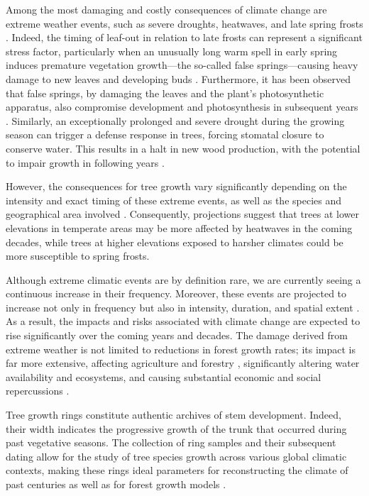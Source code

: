 \documentclass[12pt, a4paper]{article}
\begin{document}
Among the most damaging and costly consequences of climate change are extreme weather events, such as severe droughts, heatwaves, and late spring frosts \parencite{vitasse2019}. Indeed, the timing of leaf-out in relation to late frosts can represent a significant stress factor, particularly when an unusually long warm spell in early spring induces premature vegetation growth—the so-called false springs—causing heavy damage to new leaves and developing buds \parencite{gusain2026}. Furthermore, it has been observed that false springs, by damaging the leaves and the plant's photosynthetic apparatus, also compromise development and photosynthesis in subsequent years \parencite{wang2025}. Similarly, an exceptionally prolonged and severe drought during the growing season can trigger a defense response in trees, forcing stomatal closure to conserve water. This results in a halt in new wood production, with the potential to impair growth in following years \parencite{martinez-sancho2022}.

However, the consequences for tree growth vary significantly depending on the intensity and exact timing of these extreme events, as well as the species and geographical area involved \parencite{gazol2018, vitasse2019, worbes1999}. Consequently, projections suggest that trees at lower elevations in temperate areas may be more affected by heatwaves in the coming decades, while trees at higher elevations exposed to harsher climates could be more susceptible to spring frosts.

Although extreme climatic events are by definition rare, we are currently seeing a continuous increase in their frequency. Moreover, these events are projected to increase not only in frequency but also in intensity, duration, and spatial extent \parencite{ebi2021}. As a result, the impacts and risks associated with climate change are expected to rise significantly over the coming years and decades. The damage derived from extreme weather is not limited to reductions in forest growth rates; its impact is far more extensive, affecting agriculture and forestry \parencite{kirilenko2007}, significantly altering water availability and ecosystems, and causing substantial economic and social repercussions \parencite{averbeck2026, mohr2025}.

Tree growth rings constitute authentic archives of stem development. Indeed, their width indicates the progressive growth of the trunk that occurred during past vegetative seasons. The collection of ring samples and their subsequent dating allow for the study of tree species growth across various global climatic contexts, making these rings ideal parameters for reconstructing the climate of past centuries \parencite{novakova2021} as well as for forest growth models \parencite{wang2025}.
\end{document}
